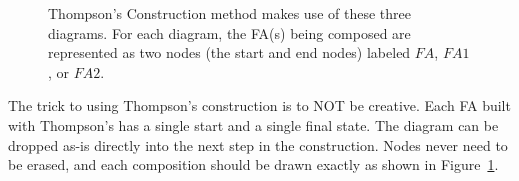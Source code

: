 \documentclass[letterpaper,12pt,openany,reqno]{book}%
\newcommand{\faterminalnode}[3] {\draw (#1) circle [radius=9pt]; \node at (#1) (#2) [circle, draw, minimum size=24pt] {#2};}
\newcommand{\fastart}[1] {\coordinate (start) at (#1);}
\newcommand{\fanonterminalnode}[2] {\node at (#1) (#2) [circle, draw, minimum size=24pt] {#2};}
\newcommand{\fatransition}[3] {\draw [->] (#1) -- (#2) node [midway, above] {#3};}
\newcommand{\faarctransition}[5] {\draw [->] (#1) to[out=#4, in=#5] node  [midway, above] {#3} (#2) ;}
\begin{document}
\begin{figure}[hbt]
\centering




 \caption[Thompson's Construction]{Thompson's Construction method makes use of these three diagrams. For each diagram, the FA(s) being composed are represented as two nodes (the start and end nodes) labeled $FA$, $FA 1$, or $FA 2$.}
  \label{F.Thompsons}
\end{figure}

The trick to using Thompson's construction is to NOT be creative. Each FA built with Thompson's has a single start and a single final state. The diagram can be dropped as-is directly into the next step in the construction. Nodes never need to be erased, and each composition should be drawn exactly as shown in Figure~\ref{F.Thompsons}.
\end{document}
